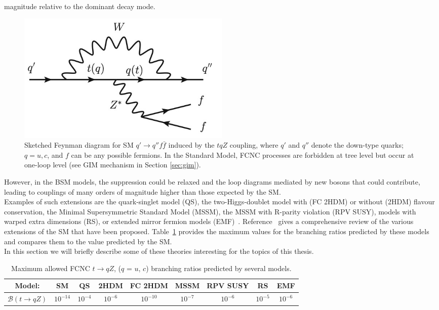 magnitude relative to the dominant decay mode\cite{tcZ_sm}.
\begin{figure}[!h]
	\centering
	\includegraphics[width=0.5\textwidth]{Chapters/CH1/figures/tqZ_fey}
	\caption{Sketched Feynman diagram for SM $q' \rightarrow q'' f \bar{f}$ induced by the $tqZ$ coupling, where $q'$ and $q''$ denote the down-type quarks; $q = u, c$, and $f$ can be any possible fermions. In the Standard Model, FCNC processes are forbidden at tree level but occur at one-loop level (see GIM mechanism in Section \ref{sec:gim}).}
	\label{fig:tqZ_fey}
\end{figure}

\noindent However, in the BSM models, the suppression could be relaxed and the loop diagrams mediated by new bosons that could contribute, 
leading to couplings of many orders of magnitude higher than those expected by the SM.\\
Examples of such extensions are the quark-singlet model (QS)\cite{qs_limit}, the two-Higgs-doublet model with (FC 2HDM) or without (2HDM) flavour conservation\cite{h2dm_limit},
the Minimal Supersymmetric Standard Model (MSSM)\cite{mssm_limit}, the MSSM with R-parity violation (RPV SUSY)\cite{RPV_limit}, models with warped extra dimensions (RS)\cite{extra_limit}, or extended mirror fermion models (EMF)~\cite{rs_limit}.
Reference~\cite{report_limit} gives a comprehensive review of the various extensions of the SM that have been proposed.
Table~\ref{tab:expBR} provides the maximum values for the branching ratios  predicted by these models and compares them to the value predicted by the SM.\\
In this section we will briefly describe some of these theories interesting for the topics of this thesis.
\begin{table}[!h]
	\begin{adjustbox}{max width=1.\textwidth,center}
		\begin{tabular}{ccccccccc}
			\hline 
			Model:&  			                         SM&  				   QS&  			   2HDM&  				FC 2HDM				& MSSM 			&  RPV SUSY			&  			RS				& EMF \\ 
			\hline 
			$\mathcal{B}(t\rightarrow qZ)$ & $10^{-14}$     & $10^{-4}$ &  $10^{-6}$          & $10^{-10}$  & $10^{-7}$      &$10^{-6}$            & $10^{-5}$           & $10^{-6}$  \\ 
			\hline 
		\end{tabular} 
	\end{adjustbox}
\caption{Maximum allowed FCNC $t\rightarrow qZ$, ($q$ = $u$, $c$) branching ratios predicted by several models\cite{tcZ_sm,qs_limit,h2dm_limit,mssm_limit,RPV_limit,extra_limit,rs_limit,report_limit}.}
\label{tab:expBR}
\end{table} 

